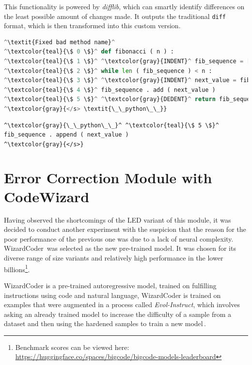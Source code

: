         This functionality is powered by \emph{difflib}, which can smartly identify differences on the least possible amount of changes made. It outputs the traditional \texttt{diff} format, which is then transformed into this custom version.
        
        \begin{minipage}{.45\textwidth}
            \begin{lstlisting}[language=Python, caption={Example of code in listing \ref{lst:error} formatted as an input for error patching. Italics denote global attention.}]
^\textit{Fixed bad method name}^
^\textcolor{teal}{\$ 0 \$}^ def fibonacci ( n ) :
^\textcolor{teal}{\$ 1 \$}^ ^\textcolor{gray}{INDENT}^ fib_sequence = [ 0 , 1 ] 
^\textcolor{teal}{\$ 2 \$}^ while len ( fib_sequence ) < n : 
^\textcolor{teal}{\$ 3 \$}^ ^\textcolor{gray}{INDENT}^ next_value = fib_sequence [ - 1 ] + fib_sequence [ - 2 ]
^\textcolor{teal}{\$ 4 \$}^ fib_sequence . add ( next_value ) 
^\textcolor{teal}{\$ 5 \$}^ ^\textcolor{gray}{DEDENT}^ return fib_sequence [ : n ]
^\textcolor{gray}{</s> \textit{\_\_python\_\_}} 
            \end{lstlisting}
        \end{minipage}
        \hfill
        \begin{minipage}{.45\textwidth}
            \begin{lstlisting}[caption={Code in listing \ref{lst:error} formatted as a label for a patch.}]
^\textcolor{gray}{\_\_python\_\_}^ ^\textcolor{teal}{\$ 5 \$}^ fib_sequence . append ( next_value )
^\textcolor{gray}{</s>} \end{lstlisting}
        \end{minipage}
        
    \section{Error Correction Module with CodeWizard}
    Having observed the shortcomings of the LED variant of this module, it was decided to conduct another experiment with the suspicion that the reason for the poor performance of the previous one was due to a lack of neural complexity. WizardCoder\,\cite{luo2023wizardcoder} was selected as the new pre-trained model. It was chosen for its diverse range of size variants and relatively high performance in the lower billions\footnote{Benchmark scores can be viewed here: \url{https://huggingface.co/spaces/bigcode/bigcode-models-leaderboard}}.

    WizardCoder is a pre-trained autoregressive model, trained on fulfilling instructions using code and natural language, WizardCoder is trained on examples that were augmented in a process called \emph{Evol-Instruct}, which involves asking an already trained model to increase the difficulty of a sample from a dataset and then using the hardened samples to train a new model\,\cite{luo2023wizardcoder}. 
    
